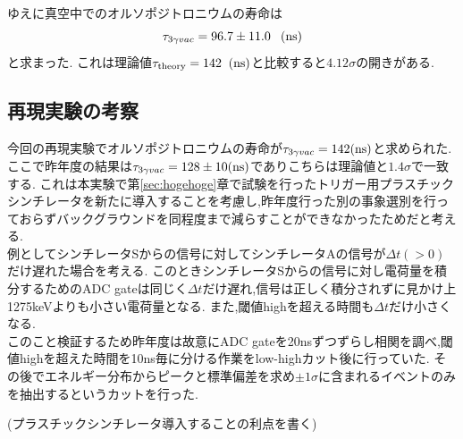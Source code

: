 ゆえに真空中でのオルソポジトロニウムの寿命は
\begin{equation}
	\tau_{3\gamma vac}=96.7 \pm 11.0 \hspace{8pt}(\rm ns)
\end{equation}
と求まった.
これは理論値$\tau_{\rm theory}=142\;\;(\rm ns)$と比較すると$4.12\sigma$の開きがある.

\subsection{再現実験の考察}
今回の再現実験でオルソポジトロニウムの寿命が$\tau_{3\gamma vac}=142(\rm ns)$と求められた.
ここで昨年度の結果は$\tau_{3\gamma vac}=128 \pm 10(\rm ns)$でありこちらは理論値と$1.4\sigma$で一致する.
これは本実験で第\ref{sec:hogehoge}章で試験を行ったトリガー用プラスチックシンチレータを新たに導入することを考慮し,昨年度行った別の事象選別を行っておらずバックグラウンドを同程度まで減らすことができなかったためだと考える. \\

例としてシンチレータSからの信号に対してシンチレータAの信号が$\Delta t(>0)$だけ遅れた場合を考える.
このときシンチレータSからの信号に対し電荷量を積分するためのADC gateは同じく$\Delta t$だけ遅れ,信号は正しく積分されずに見かけ上1275keVよりも小さい電荷量となる.
また,閾値highを超える時間も$\Delta t$だけ小さくなる.\\
このこと検証するため昨年度は故意にADC gateを20nsずつずらし相関を調べ,閾値highを超えた時間を10ns毎に分ける作業をlow-highカット後に行っていた.
その後でエネルギー分布からピークと標準偏差を求め$\pm 1\sigma$に含まれるイベントのみを抽出するというカットを行った.

(プラスチックシンチレータ導入することの利点を書く)
